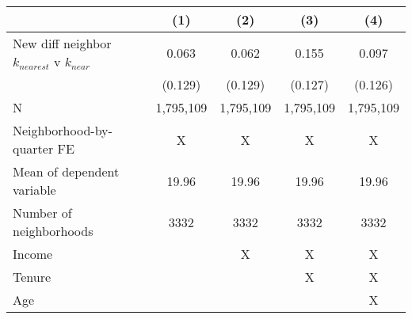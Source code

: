 \begin{tabular}{lcccc}
\toprule
  & (1) & (2) & (3) & (4) \\ 
\midrule
New diff neighbor $k_{nearest}$ v $k_{near}$ & 0.063 & 0.062 & 0.155 & 0.097 \\ 
 & (0.129) & (0.129) & (0.127) & (0.126) \\ 
\midrule
N & 1,795,109 & 1,795,109 & 1,795,109 & 1,795,109 \\ 
Neighborhood-by-quarter FE & X & X & X & X \\ 
Mean of dependent variable & 19.96 & 19.96 & 19.96 & 19.96 \\ 
Number of neighborhoods & 3332 & 3332 & 3332 & 3332 \\ 
Income &  & X & X & X \\ 
Tenure &  &  & X & X \\ 
Age &  &  &  & X \\ 
\bottomrule
\end{tabular}